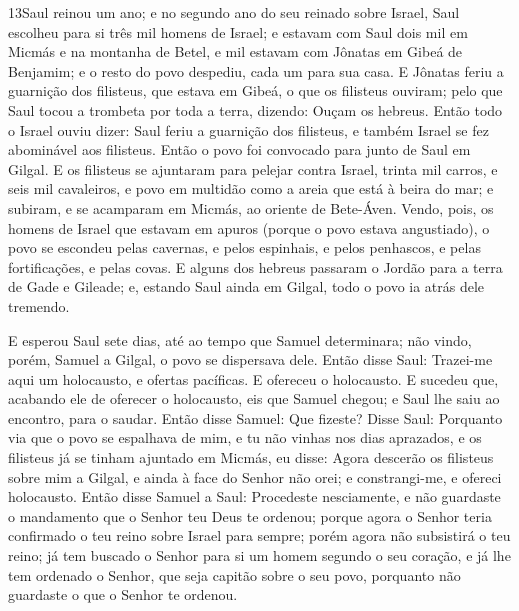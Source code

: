 \medskip

\lettrine{13} Saul reinou um ano; e no segundo ano do seu
reinado sobre Israel, Saul escolheu para si três mil homens de
Israel; e estavam com Saul dois mil em Micmás e na montanha de
Betel, e mil estavam com Jônatas em Gibeá de Benjamim; e o resto do
povo despediu, cada um para sua casa. E Jônatas feriu a
guarnição dos filisteus, que estava em Gibeá, o que os filisteus
ouviram; pelo que Saul tocou a trombeta por toda a terra, dizendo:
Ouçam os hebreus. Então todo o Israel ouviu dizer: Saul feriu a
guarnição dos filisteus, e também Israel se fez abominável aos
filisteus. Então o povo foi convocado para junto de Saul em Gilgal.
E os filisteus se ajuntaram para pelejar contra Israel, trinta
mil carros, e seis mil cavaleiros, e povo em multidão como a areia
que está à beira do mar; e subiram, e se acamparam em Micmás, ao
oriente de Bete-Áven. Vendo, pois, os homens de Israel que
estavam em apuros (porque o povo estava angustiado), o povo se
escondeu pelas cavernas, e pelos espinhais, e pelos penhascos, e
pelas fortificações, e pelas covas. E alguns dos hebreus
passaram o Jordão para a terra de Gade e Gileade; e, estando Saul
ainda em Gilgal, todo o povo ia atrás dele tremendo.

E esperou Saul sete dias, até ao tempo que Samuel determinara; não
vindo, porém, Samuel a Gilgal, o povo se dispersava dele. Então
disse Saul: Trazei-me aqui um holocausto, e ofertas pacíficas. E
ofereceu o holocausto. E sucedeu que, acabando ele de
oferecer o holocausto, eis que Samuel chegou; e Saul lhe saiu ao
encontro, para o saudar. Então disse Samuel: Que fizeste?
Disse Saul: Porquanto via que o povo se espalhava de mim, e tu não
vinhas nos dias aprazados, e os filisteus já se tinham ajuntado em
Micmás, eu disse: Agora descerão os filisteus sobre mim a
Gilgal, e ainda à face do Senhor não orei; e constrangi-me, e
ofereci holocausto. Então disse Samuel a Saul: Procedeste
nesciamente, e não guardaste o mandamento que o Senhor teu Deus te
ordenou; porque agora o Senhor teria confirmado o teu reino sobre
Israel para sempre; porém agora não subsistirá o teu reino;
já tem buscado o Senhor para si um homem segundo o seu coração, e já
lhe tem ordenado o Senhor, que seja capitão sobre o seu povo,
porquanto não guardaste o que o Senhor te ordenou.

